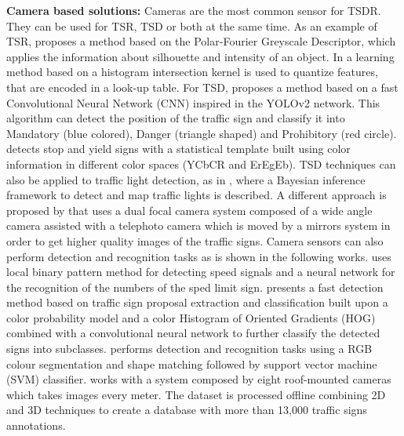 \begin{flushleft} \textbf{Camera based solutions:}
Cameras are the most common sensor for TSDR. They can be used for TSR, TSD or both at the same time.
As an example of TSR, \cite{frejlichowski2015application} proposes a method 
based on the Polar-Fourier Greyscale Descriptor, which applies the information 
about silhouette and intensity of an object. In \cite{gao2015learning} a 
learning method based on a histogram intersection kernel is used to quantize 
features, that are encoded in a look-up table.
For TSD, \cite{zhang2017real} proposes a method based on a fast Convolutional 
Neural Network (CNN) inspired in the YOLOv2 network. This algorithm 
can detect the position of the traffic sign and classify it into Mandatory 
(blue colored), Danger (triangle shaped) and Prohibitory (red circle). 
\cite{villalon2017traffic} detects stop and yield signs with a statistical 
template built using color information in different color spaces (YCbCR and 
ErEgEb). TSD techniques can also be applied to traffic light detection, as in 
\cite{hosseinyalamdary2017bayesian}, where a Bayesian inference framework to 
detect and map traffic lights is described. A different approach is proposed by 
\cite{gu2011traffic} that uses a dual focal camera system composed of a wide 
angle camera assisted with a telephoto camera which is moved by a mirrors 
system in order to get higher quality images of the traffic signs.
Camera sensors can also perform detection and recognition tasks as is 
shown in the following works. \cite{miyata2017automatic} uses local binary 
pattern method for detecting speed signals and a neural network for the 
recognition of the numbers of the sped limit sign. \cite{yang2016towards} 
presents a fast detection method based on traffic sign proposal extraction and 
classification built upon a color probability model and a color Histogram of
Oriented Gradients (HOG) combined with a convolutional neural network to
further classify the detected signs into subclasses.
\cite{wali2015automatic} performs detection and recognition tasks using a RGB 
colour segmentation and shape matching followed by support vector machine (SVM) 
classifier. \cite{timofte2014multi} works with a system composed by eight 
roof-mounted cameras which takes images every meter. The dataset is processed 
offline combining 2D and 3D techniques to create a database with more than 
13,000 traffic signs annotations.
\end{flushleft}

